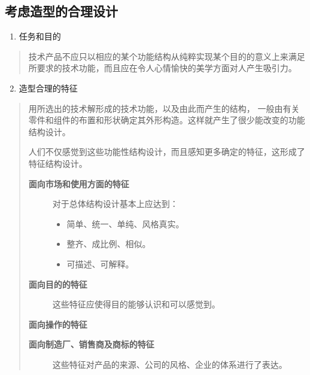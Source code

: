 \documentclass[letterpaper,10pt,english]{sphinxmanual}
\begin{document}
\subsection{考虑造型的合理设计}
\label{unit6:id19}\begin{enumerate}
\item {} 
任务和目的

\end{enumerate}
\begin{quote}

技术产品不应只以相应的某个功能结构从纯粹实现某个目的的意义上来满足所要求的技术功能，而且应在令人心情愉快的美学方面对人产生吸引力。
\end{quote}
\begin{enumerate}
\setcounter{enumi}{1}
\item {} 
造型合理的特征

\end{enumerate}
\begin{quote}

用所选出的技术解形成的技术功能，以及由此而产生的结构，
一般由有关零件和组件的布置和形状确定其外形构造。这样就产生了很少能改变的功能结构设计。

人们不仅感觉到这些功能性结构设计，而且感知更多确定的特征，这形成了特征结构设计。
\begin{description}
\item[{\textbf{面向市场和使用方面的特征}}] \leavevmode
对于总体结构设计基本上应达到：
\begin{itemize}
\item {} 
简单、统一、单纯、风格真实。

\item {} 
整齐、成比例、相似。

\item {} 
可描述、可解释。

\end{itemize}

\item[{\textbf{面向目的的特征}}] \leavevmode
这些特征应使得目的能够认识和可以感觉到。

\end{description}

\textbf{面向操作的特征}
\begin{description}
\item[{\textbf{面向制造厂、销售商及商标的特征}}] \leavevmode
这些特征对产品的来源、公司的风格、企业的体系进行了表达。

\end{description}
\end{quote}
\end{document}
